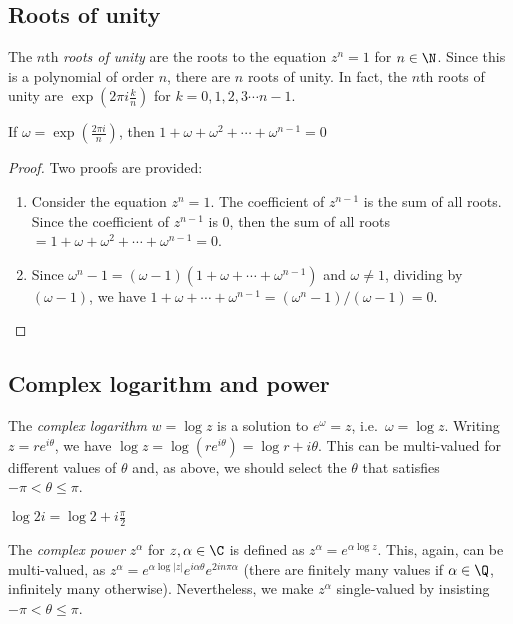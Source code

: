 \documentclass[a4paper]{article}
\begin{document}
\subsection{Roots of unity}
\begin{defi}
  The $n$th \emph{roots of unity} are the roots to the equation $z^n = 1$ for $n\in \N$. Since this is a polynomial of order $n$, there are $n$ roots of unity. In fact, the $n$th roots of unity are $\exp\left(2\pi i\frac{k}{n}\right)$ for $k = 0, 1, 2, 3\cdots n - 1$.
\end{defi}

\begin{prop}
  If $\omega = \exp\left(\frac{2\pi i}{n}\right)$, then $1 + \omega + \omega^2 + \cdots + \omega^{n - 1} = 0$
\end{prop}

\begin{proof}
  Two proofs are provided:
  \begin{enumerate}
    \item Consider the equation $z^n = 1$. The coefficient of $z^{n-1}$ is the sum of all roots. Since the coefficient of $z^{n-1}$ is 0, then the sum of all roots $= 1 + \omega + \omega^2 + \cdots + \omega^{n-1} = 0$.
    \item Since $\omega^n - 1 = (\omega - 1)(1 + \omega + \cdots + \omega^{n - 1})$ and $\omega \not= 1$, dividing by $(\omega - 1)$, we have $1 + \omega + \cdots + \omega^{n-1} = (\omega^n - 1)/(\omega - 1) = 0$. \qedhere
  \end{enumerate}
\end{proof}

\subsection{Complex logarithm and power}
\begin{defi}
  The \emph{complex logarithm} $w = \log z$ is a solution to $e^\omega = z$, i.e.\ $\omega = \log z$. Writing $z = re^{i\theta}$, we have $\log z = \log(re^{i\theta}) = \log r + i\theta$. This can be multi-valued for different values of $\theta$ and, as above, we should select the $\theta$ that satisfies $-\pi < \theta \leq \pi$.
\end{defi}
\begin{eg}
  $\log 2i = \log 2 + i\frac{\pi}{2}$
\end{eg}

\begin{defi}
  The \emph{complex power} $z^\alpha$ for $z, \alpha\in \C$ is defined as $z^\alpha = e^{\alpha\log z}$. This, again, can be multi-valued, as $z^\alpha = e^{\alpha\log|z|}e^{i\alpha\theta}e^{2in\pi\alpha}$ (there are finitely many values if $\alpha\in\Q$, infinitely many otherwise). Nevertheless, we make $z^\alpha$ single-valued by insisting $-\pi < \theta \leq \pi$.
\end{defi}
\end{document}
